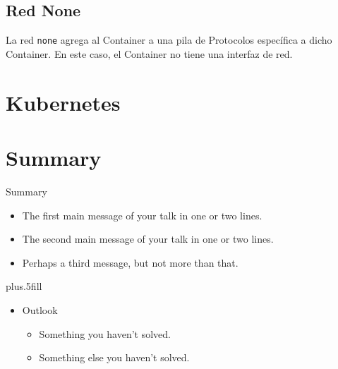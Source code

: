 \documentclass{beamer}
\begin{document}
\subsection{Red None}

\begin{frame}
	La red \texttt{none} agrega al Container a una pila de Protocolos específica a dicho Container. En este caso, el Container no tiene una interfaz de red.
\end{frame}

\section{Kubernetes}


\section*{Summary}

\begin{frame}{Summary}

  \begin{itemize}
  \item
    The \alert{first main message} of your talk in one or two lines.
  \item
    The \alert{second main message} of your talk in one or two lines.
  \item
    Perhaps a \alert{third message}, but not more than that.
  \end{itemize}
  
  \vskip0pt plus.5fill
  \begin{itemize}
  \item
    Outlook
    \begin{itemize}
    \item
      Something you haven't solved.
    \item
      Something else you haven't solved.
    \end{itemize}
  \end{itemize}
\end{frame}
\end{document}
